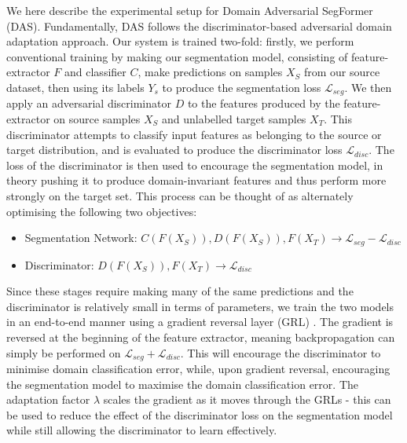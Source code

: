\documentclass[a4paper,12pt]{report}
\begin{document}
We here describe the experimental setup for Domain Adversarial SegFormer (DAS). Fundamentally, DAS follows the discriminator-based adversarial domain adaptation approach. Our system is trained two-fold: firstly, we perform conventional training by making our segmentation model, consisting of feature-extractor $F$ and classifier $C$, make predictions on samples $X_S$ from our source dataset, then using its labels $Y_s$ to produce the segmentation loss $\mathcal{L}_{seg}$. We then apply an adversarial discriminator $D$ to the features produced by the feature-extractor on source samples $X_S$ and unlabelled target samples $X_T$. This discriminator attempts to classify input features as belonging to the source or target distribution, and is evaluated to produce the discriminator loss $\mathcal{L}_{disc}$. The loss of the discriminator is then used to encourage the segmentation model, in theory pushing it to produce domain-invariant features and thus perform more strongly on the target set. This process can be thought of as alternately optimising the following two objectives:

\begin{itemize}
    \item Segmentation Network: $C(F(X_S)), D(F(X_S)), F(X_T) \rightarrow \mathcal{L}_{seg} - \mathcal{L}_{disc} $
    \item Discriminator: $D(F(X_S)), F(X_T) \rightarrow \mathcal{L}_{disc}$
\end{itemize}

Since these stages require making many of the same predictions and the discriminator is relatively small in terms of parameters, we train the two models in an end-to-end manner using a gradient reversal layer (GRL) \cite{ganin_domain-adversarial_2016}. The gradient is reversed at the beginning of the feature extractor, meaning backpropagation can simply be performed on $\mathcal{L}_{seg} + \mathcal{L}_{disc}$. This will encourage the discriminator to minimise domain classification error, while, upon gradient reversal, encouraging the segmentation model to maximise the domain classification error. The adaptation factor $\lambda$ scales the gradient as it moves through the GRLs - this can be used to reduce the effect of the discriminator loss on the segmentation model while still allowing the discriminator to learn effectively.
\end{document}
